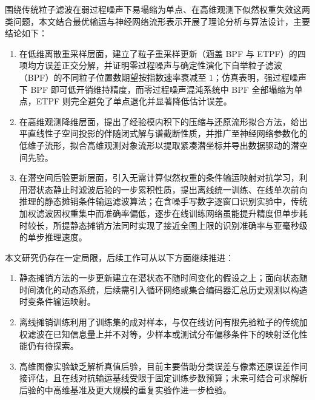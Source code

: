 \begin{conclusions}
围绕传统粒子滤波在弱过程噪声下易塌缩为单点、在高维观测下似然权重失效这两类问题，本文结合最优输运与神经网络流形表示开展了理论分析与算法设计，主要结论如下：
\begin{enumerate}[label=(\arabic*),leftmargin=0pt,labelindent=2\ccwd,itemindent=*,labelsep=0.4em,nosep]
  \item 在低维离散重采样层面，建立了粒子重采样更新（涵盖 BPF 与 ETPF）的四项均方误差正交分解，并证明零过程噪声与确定性演化下自举粒子滤波（BPF）的不同粒子位置数期望按指数速率衰减至 $1$；仿真表明，强过程噪声下 BPF 即可低开销维持精度，而零过程噪声混沌系统中 BPF 全部塌缩为单点，ETPF 则完全避免了单点退化并显著降低估计误差。
  \item 在高维观测降维层面，提出了经验模内积下的压缩与还原流形拟合方法，给出平直线性子空间投影的伴随闭式解与谱截断性质，并推广至神经网络参数化的低维子流形，拟合高维观测对象流形以提取紧凑潜坐标并导出数据驱动的潜空间先验。
  \item 在潜空间后验更新层面，引入无需计算似然权重的条件输运映射对抗学习，利用潜状态静止时滤波后验的一步累积性质，提出离线统一训练、在线单次前向推理的静态摊销条件输运滤波算法；在含噪手写数字逐窗口识别实验中，传统加权滤波因权重集中而准确率偏低，逐步在线训练网络虽能提升精度但单步耗时较长，所提静态摊销方法同时实现了接近全图上限的识别准确率与亚毫秒级的单步推理速度。
\end{enumerate}

本文研究仍存在一定局限，后续工作可从以下方面继续推进：
\begin{enumerate}[label=(\arabic*),leftmargin=0pt,labelindent=2\ccwd,itemindent=*,labelsep=0.4em,nosep]
  \item 静态摊销方法的一步更新建立在潜状态不随时间变化的假设之上；面向状态随时间演化的动态系统，后续需引入循环网络或集合编码器汇总历史观测以构造时变条件输运映射。
  \item 离线摊销训练利用了训练集的成对样本，与仅在线访问有限先验粒子的传统加权滤波在已知信息量上并不对等，少样本或测试分布偏移条件下的映射泛化性能仍有待探索。
  \item 高维图像实验缺乏解析真值后验，目前主要借助分类误差与像素还原误差作间接评估，且在线对抗输运基线受限于固定训练步数预算；未来可结合可求解析后验的中高维基准及更大规模的重复实验作进一步检验。
\end{enumerate}
\end{conclusions}
